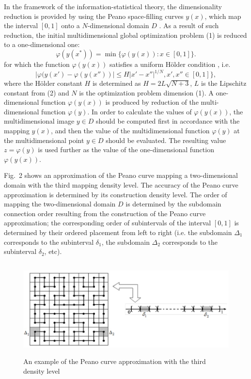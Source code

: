 \documentclass[
11pt,%
tightenlines,%
twoside,%
onecolumn,%
nofloats,%
nobibnotes,%
nofootinbib,%
superscriptaddress,%
noshowpacs,%
centertags]%
{revtex4}
\begin{document}
In the framework of the information-statistical theory, the dimensionality reduction is provided by using the Peano space-filling curves $y(x)$, which map the interval $[0, 1]$ onto a $N$-dimensional domain $D$ \cite{Strongin1, Sergeyev2, Strongin3}. As a result of such reduction, the initial multidimensional global optimization problem (1) is reduced to a one-dimensional one:
\begin{equation}
\varphi(y(x^\ast)) = \min\{\varphi(y(x)): x \in [0,1]\}.
\end{equation}
for which the function $\varphi(y(x))$ satisfies a uniform H\"older condition \cite{Strongin1}, i.e.
\begin{equation}
|\varphi(y(x')-\varphi(y(x''))| \leq H|x' - x''|^{1/N}, x', x'' \in [0,1]\},
\end{equation}
where the H\"older constant $H$ is determined as $H = 2L\sqrt{N + 3}$, $L$ is the Lipschitz constant from (2) and $N$ is the optimization problem dimension (1). A one-dimensional function $\varphi(y(x))$ is produced by reduction of the multi-dimensional function $\varphi(y)$. In order to calculate the values of $\varphi(y(x))$, the multidimensional image $y \in D$ should be computed first in accordance with the mapping $y(x)$, and then the value of the multidimensional function $\varphi(y)$ at the multidimensional point $y \in D$ should be evaluated. The resulting value $z = \varphi(y)$ is used further as the value of the one-dimensional function $\varphi(y(x))$.

Fig.~2 shows an approximation of the Peano curve mapping a two-dimensional domain with the third mapping density level. The accuracy of the Peano curve approximation is determined by its construction density level. The order of mapping the two-dimensional domain $D$ is determined by the subdomain connection order resulting from the construction of the Peano curve approximation; the corresponding order of subintervals of the interval $[0, 1]$ is determined by their ordered placement from left to right (i.e. the subdomain $\Delta_1$ corresponds to the subinterval $\delta_1$, the subdomain $\Delta_2$ corresponds to the subinterval $\delta_2$, etc).

\begin{figure}
\centering
\includegraphics[height=5.0cm]{Fig2}
\caption{An example of the Peano curve approximation with the third density level}
\label{fig:Fig2}
\end{figure}
\end{document}
